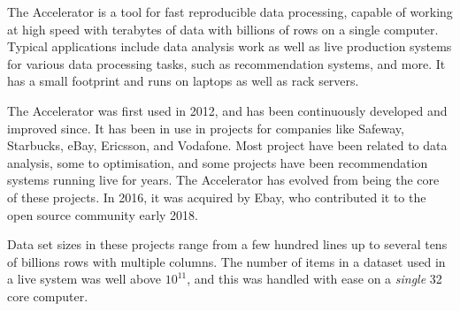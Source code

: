 
The Accelerator is a tool for fast reproducible data processing, capable of working
at high speed with terabytes of data with billions of rows on a single
computer.  Typical applications include data analysis work as well as
live production systems for various data processing tasks, such as
recommendation systems, and more.  It has a small footprint and runs
on laptops as well as rack servers.

The Accelerator was first used in 2012, and has been continuously developed and
improved since.  It has been in use in projects for companies like
Safeway, Starbucks, eBay, Ericsson, and Vodafone.  Most project have
been related to data analysis, some to optimisation, and some projects
have been recommendation systems running live for years.  The
Accelerator has evolved from being the core of these projects.  In
2016, it was acquired by Ebay, who contributed it to the open source
community early 2018.

Data set sizes in these projects range from a few hundred lines up to
several tens of billions rows with multiple columns.  The number of
items in a dataset used in a live system was well above $10^{11}$, and
this was handled with ease on a \emph{single} 32 core computer.

